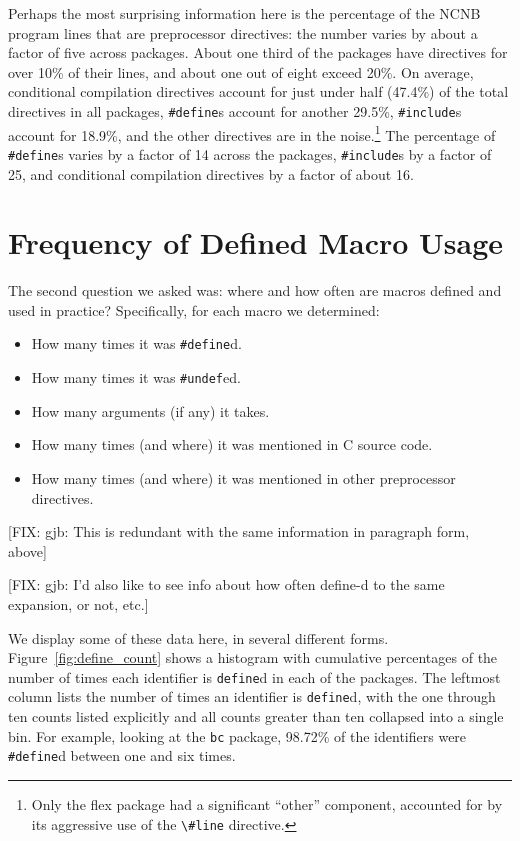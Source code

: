 Perhaps the most surprising information here is the percentage of the
NCNB program lines that are preprocessor directives: the number varies
by about a factor of five across packages.  About one third of the
packages have directives for over 10\% of their lines, and about one
out of eight exceed 20\%.  On average, conditional compilation
directives account for just under half (47.4\%) of the total
directives in all packages, \verb+#define+s account for another
29.5\%, \verb+#include+s account for 18.9\%, and the other directives
are in the noise.\footnote{Only the flex package had a significant
``other'' component, accounted for by its aggressive use of the
\verb+\#line+ directive.} The percentage of \verb+#define+s varies by a factor of 14
across the packages, \verb+#include+s by a factor of 25, and
conditional compilation directives by a factor of about 16.

\section{Frequency of Defined Macro Usage}\label{sec:usage}

The second question we asked was: where and how often are macros
defined and used in practice?  Specifically, for each macro we
determined:
\begin{itemize}\itemsep 0pt \parskip 0pt

\item How many times it was \verb+#define+d.
\item How many times it was \verb+#undef+ed.
\item How many arguments (if any) it takes.
\item How many times (and where) it was mentioned in C source code.
\item How many times (and where) it was mentioned in other
preprocessor directives.

\end{itemize}
[FIX: gjb: This is redundant with the same information in paragraph
form, above]

[FIX: gjb: I'd also like to see info about how often define-d to the same
expansion, or not, etc.]


We display some of these data here, in several different forms.
Figure~\ref{fig:define_count} shows a histogram with cumulative
percentages of the number of times each identifier is \verb+define+d
in each of the packages.  The leftmost column lists the number of
times an identifier is \verb+define+d, with the one through ten counts
listed explicitly and all counts greater than ten collapsed into a
single bin.  For example, looking at the \verb+bc+ package, 98.72\% of
the identifiers were \verb+#define+d between one and six times.

